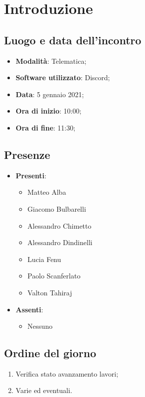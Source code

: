 \documentclass[]{article}
\begin{document}
	
	
	
	\newpage
	
	\section{Introduzione}
		\subsection{Luogo e data dell'incontro}
		\begin{itemize}
			\item \textbf{Modalità}: Telematica;
			\item \textbf{Software utilizzato}: Discord;
			\item \textbf{Data}: 5 gennaio 2021;
			\item \textbf{Ora di inizio}: 10:00;
			\item \textbf{Ora di fine}: 11:30;
		\end{itemize}

		\subsection{Presenze}
		\begin{itemize}
			\item \textbf{Presenti}:
		\begin{itemize}
			\item Matteo Alba
			\item Giacomo Bulbarelli
			\item Alessandro Chimetto
			\item Alessandro Dindinelli
			\item Lucia Fenu
			\item Paolo Scanferlato
			\item Valton Tahiraj
		\end{itemize}
			\item \textbf{Assenti}:
			\begin{itemize}
				\item Nessuno
			\end{itemize}
		\end{itemize}
	
		\subsection{Ordine del giorno}
		\begin{enumerate}
			\item Verifica stato avanzamento lavori;
			\item Varie ed eventuali.
		\end{enumerate}
	
\end{document}
